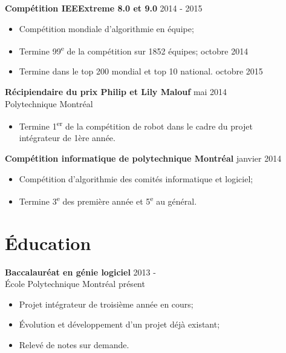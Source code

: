 \documentclass[margin]{res}
\begin{document}
\begin{resume}
  {\bf Comp\'etition IEEExtreme 8.0 et 9.0} \hfill 2014 - 2015
  \begin{itemize} \itemsep -2pt
  \item Comp\'etition mondiale d'algorithmie en \'equipe;
  \item Termine 99\textsuperscript{e} de la comp\'etition sur 1852 \'equipes; \hfill octobre 2014
  \item Termine dans le top 200 mondial et top 10 national. \hfill octobre 2015
  \end{itemize}

  {\bf R\'{e}cipiendaire du prix Philip et Lily Malouf} \hfill mai 2014\\
  Polytechnique Montr\'eal
  \begin{itemize} \itemsep -2pt
  \item Termine 1\textsuperscript{er} de la comp\'{e}tition de robot dans le cadre du projet\\   int\'{e}grateur de 1\`{e}re ann\'{e}e.
  \end{itemize}

  {\bf Comp\'{e}tition informatique de polytechnique Montr\'{e}al} \hfill janvier 2014
  \begin{itemize} \itemsep -2pt
  \item Comp\'{e}tition d'algorithmie des comit\'{e}s informatique et logiciel;
  \item Termine 3\textsuperscript{e} des premi\`{e}re ann\'{e}e et 5\textsuperscript{e} au g\'{e}n\'{e}ral.
  \end{itemize}


  \section{\'{E}ducation}

  {\bf Baccalaur\'eat en g\'{e}nie logiciel} \hfill 2013 -\\
  \'{E}cole Polytechnique Montr\'{e}al \hfill pr\'{e}sent
  \begin{itemize} \itemsep -2pt
\item Projet int\'egrateur de troisi\`eme ann\'ee en cours;
\item \'Evolution et d\'eveloppement d'un projet d\'ej\`a existant;
  \item Relev\'{e} de notes sur demande.
  \end{itemize}



\end{resume}
\end{document}
